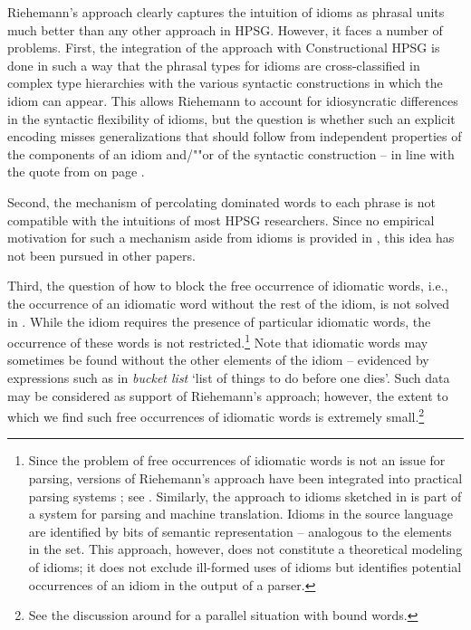 \documentclass[output=paper
 	        ,biblatex
                ,babelshorthands
                ,newtxmath
                ,draftmode
                ,colorlinks, citecolor=brown
]{langscibook}
\begin{document}
Riehemann's approach clearly captures the intuition of idioms as phrasal units much better than any
other approach in HPSG.  However, it faces a number of problems.  First, the integration of the
approach with Constructional HPSG is done in such a way that the phrasal types for idioms are
cross-classified in complex type hierarchies with the various syntactic constructions in which the
idiom can appear.  This allows Riehemann to account for idiosyncratic differences in the syntactic
flexibility of idioms, but the question is whether such an explicit encoding misses generalizations
that should follow from independent properties of the components of an idiom and/""or of the
syntactic construction -- in line with the quote from \citet{NSW94a} on page \pageref{NSW-quote}.

Second, the mechanism of percolating dominated words to each phrase is not compatible with the
intuitions of most HPSG researchers.  Since no empirical motivation for such a mechanism aside from
idioms is provided in \citet{Riehemann2001a}, this idea has not been pursued in other papers.

Third, the question of how to block the free occurrence of idiomatic words, i.e., the occurrence of
an idiomatic word without the rest of the idiom, is not solved in \citet{Riehemann2001a}. While the
idiom requires the presence of particular idiomatic words, the occurrence of these words is not
restricted.\footnote{Since the problem of free occurrences of idiomatic words is not an issue for
  parsing, versions of Riehemann's approach have been integrated into practical parsing systems
  \citep{Villavicencio:Copestake:02}; see .  Similarly, the approach to idioms
  sketched in \citet{Flickinger:15Slides2} is part of a system for parsing and machine
  translation. Idioms in the source language are identified by bits of
  semantic representation -- analogous to the elements in the  set. This approach,
  however, does not constitute a theoretical modeling of idioms; it does not exclude ill-formed uses
  of idioms but identifies potential occurrences of an idiom in the output of a parser.}  Note that
idiomatic words may sometimes be found without the other elements of the idiom -- evidenced by
expressions such as in \emph{bucket list} `list of things to do before one dies'. Such data may be
considered as support of Riehemann's approach; however, the extent to which we find such free
occurrences of idiomatic words is extremely small.\footnote{See the discussion around 
  for a parallel situation with bound words.}
\end{document}
